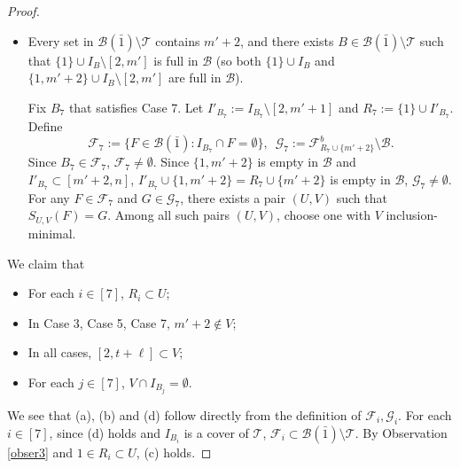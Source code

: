 \documentclass[10pt,a4paper]{amsart}
\newcommand{\m}{\mathcal}
\begin{document}
\begin{proof}
\begin{itemize}
Fix $B_6$ that satisfies Case 6. 
Let $I'_{B_6}:=I_{B_6}\setminus [2,m']$ and $R_6:=\{1\}\cup I'_{B_6}$.
Define
\begin{equation*}
    \m F_6:=\{F\in \m B(\bar1): I_{B_6}\cap F=\emptyset\}, \,\,\,
    \m G_6:=\m F_{R_6}^b\setminus \m B.
\end{equation*}
Since $B_6\in \m F_6$, $\m F_6\ne \emptyset$. Since $R_6$ is non-full in $\m B$, $\m G_6\ne \emptyset$. 
For any $F\in \m F_6$ and $G\in \m G_6$, there exists a pair $(U,V)$ such that $S_{U,V}(F)=G$. Among all such pairs $(U,V)$, choose one with $V$ inclusion-minimal.

\item[Case 7.] Every set in $\m B(\bar{1})\setminus \m T$ contains $m'+2$, and there exists $B\in \m B(\bar{1})\setminus \m T$ such that $\{1\}\cup I_{B}\setminus [2,m']$ is full in $\m B$ (so both $\{1\}\cup I_{B}$ and 
$\{1,m'+2\}\cup I_{B}\setminus [2,m']$ are full in $\m B$). 

Fix $B_7$ that satisfies Case 7. 
Let $I'_{B_7}:=I_{B_7}\setminus [2,m'+1]$ and $R_7:=\{1\}\cup I'_{B_7}$.
Define
\begin{equation*}
    \m F_7:=\{F\in \m B(\bar1): I_{B_7}\cap F=\emptyset\}, \,\,\,
    \m G_7:=\m F_{R_7\cup \{m'+2\}}^b\setminus \m B.
\end{equation*}
Since $B_7\in \m F_7$, $\m F_7\ne \emptyset$. 
Since $\{1,m'+2\}$ is empty in $\m B$ and $I'_{B_7}\subset [m'+2, n]$, $I'_{B_7}\cup \{1, m'+2\}=R_7\cup \{m'+2\}$ is empty in $\m B$, $\m G_7\ne \emptyset$. 
For any $F\in \m F_7$ and $G\in \m G_7$, there exists a pair $(U,V)$ such that $S_{U,V}(F)=G$. Among all such pairs $(U,V)$, choose one with $V$ inclusion-minimal.
\end{itemize}




We claim that
\begin{itemize}
    \item[(a)] For each $i\in [7]$, $R_i\subset U$; 
    \item[(b)] In Case 3, Case 5, Case 7, $m'+2\not\in V$; 
    \item[(c)] In all cases, $[2,t+\ell]\subset V$;
    \item[(d)] For each $j\in [7]$, $V\cap I_{B_j}=\emptyset.$
\end{itemize}

We see that (a), (b) and (d)  follow directly from 
the definition of $\m F_i, \m G_i$. 
For each $i\in [7]$, since (d) holds and $I_{B_i}$ is a cover of $\m T$, $\m F_i\subset \m B(\bar 1)\setminus \m T$.
By Observation \ref{obser3} and $1\in R_i\subset U$, (c) holds. 


\end{proof}
\end{document}

